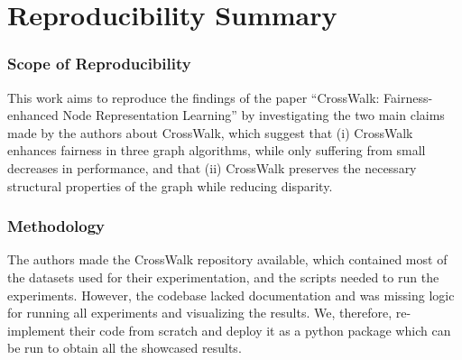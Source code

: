 \section*{\centering Reproducibility Summary}


\subsubsection*{Scope of Reproducibility}
This work aims to reproduce the findings of the paper “CrossWalk: Fairness-enhanced Node Representation Learning” \cite{crosswalk} by investigating the two main claims made by the authors about CrossWalk, which suggest that (i) CrossWalk enhances fairness in three graph algorithms, while only suffering from small decreases in performance, and that (ii) CrossWalk preserves the necessary structural properties of the graph while reducing disparity. \vspace{-1mm}



\subsubsection*{Methodology}
The authors made the CrossWalk repository available, which contained most of the datasets used for their experimentation, and the scripts needed to run the experiments. However, the codebase lacked documentation and was missing logic for running all experiments and visualizing the results. We, therefore, re-implement their code from scratch and deploy it as a python package which can be run to obtain all the showcased results. \vspace{-1mm}


